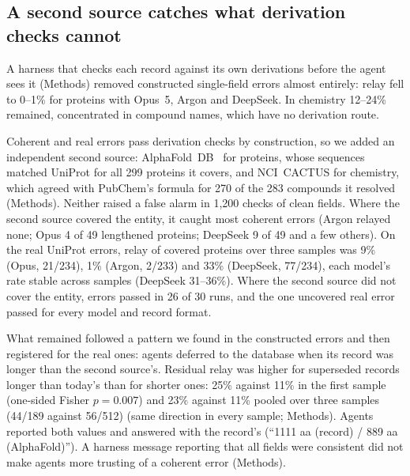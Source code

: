 \subsection*{A second source catches what derivation checks cannot}
A harness that checks each record against its own derivations before the agent sees it (Methods) removed constructed single-field
errors almost entirely: relay fell to 0--1\% for proteins with Opus~5, Argon and DeepSeek. In chemistry 12--24\% remained,
concentrated in compound names, which have no derivation route.

Coherent and real errors pass derivation checks by construction, so we added an independent second source: AlphaFold~DB~\cite{varadi2024alphafolddb,jumper2021alphafold} for proteins, whose sequences matched UniProt for all 299 proteins it covers, and NCI~CACTUS for chemistry, which agreed with PubChem's
formula for 270 of the 283 compounds it resolved (Methods). Neither raised a false alarm in 1,200 checks of clean fields. Where the second source covered the entity, it caught most coherent errors (Argon relayed none; Opus 4 of 49 lengthened proteins; DeepSeek 9 of 49 and a few others). On the real UniProt errors, relay of covered proteins over three samples was 9\% (Opus, 21/234), 1\% (Argon, 2/233) and 33\% (DeepSeek, 77/234), each model's rate stable across samples (DeepSeek 31--36\%). Where the second source did not cover the
entity, errors passed in 26 of 30 runs, and the one uncovered real error passed for every model and record format.

What remained followed a pattern we found in the constructed errors and then registered for the real ones: agents deferred to the
database when its record was longer than the second source's. Residual relay was higher for superseded records longer than today's than for shorter ones: 25\% against 11\% in the first sample (one-sided Fisher $p = 0.007$) and 23\% against 11\% pooled over three samples (44/189 against 56/512) (same direction in every sample; Methods). Agents reported
both values and answered with the record's (``1111 aa (record) / 889 aa (AlphaFold)''). A harness message reporting that all fields were consistent did not make agents more trusting of a coherent error (Methods).


